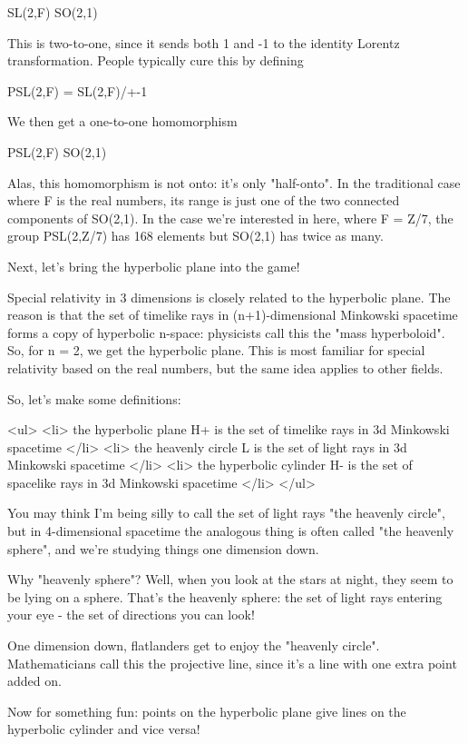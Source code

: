 SL(2,F) \to  SO(2,1)

This is two-to-one, since it sends both 1 and -1 to the identity Lorentz 
transformation.   People typically cure this by defining

PSL(2,F) = SL(2,F)/{+-1}

We then get a one-to-one homomorphism

PSL(2,F) \to  SO(2,1)

Alas, this homomorphism is not onto: it's only "half-onto".  
In the traditional
case where F is the real numbers, its range is just one of the two connected 
components of SO(2,1).  In the case we're interested in here, where F = Z/7, 
the group PSL(2,Z/7) has 168 elements but SO(2,1) has twice as many. 

Next, let's bring the hyperbolic plane into the game!

Special relativity in 3 dimensions is closely related to the hyperbolic
plane.  The reason is that the set of timelike rays in (n+1)-dimensional Minkowski
spacetime forms a copy of hyperbolic n-space: physicists call this the
"mass hyperboloid".   
So, for n = 2, we get the hyperbolic plane.  This is 
most familiar for special relativity based on the real numbers, but the same 
idea applies to other fields.

So, let's make some definitions:

<ul>
<li>
  the hyperbolic plane H+ is the set of timelike rays in 3d Minkowski spacetime
</li>
<li>
  the heavenly circle L is the set of light rays in 3d Minkowski spacetime
</li>
<li>
  the hyperbolic cylinder H- is the set of spacelike rays in 3d Minkowski spacetime
</li>
</ul>

You may think I'm being silly to call the set of light rays "the heavenly
circle", 
but in 4-dimensional spacetime the analogous thing is often called 
"the heavenly sphere", and we're studying things one dimension down.

Why "heavenly sphere"?  
Well, when you look at the stars at night, they seem to 
be lying on a sphere.  That's the heavenly sphere: the set of light rays 
entering 
your eye - the set of directions you can look!  

One dimension down, flatlanders get to enjoy the "heavenly circle".  Mathematicians 
call this the projective line, since it's a line with one extra point added on.

Now for something fun: points on the hyperbolic plane give lines on the 
hyperbolic cylinder and vice versa!  

